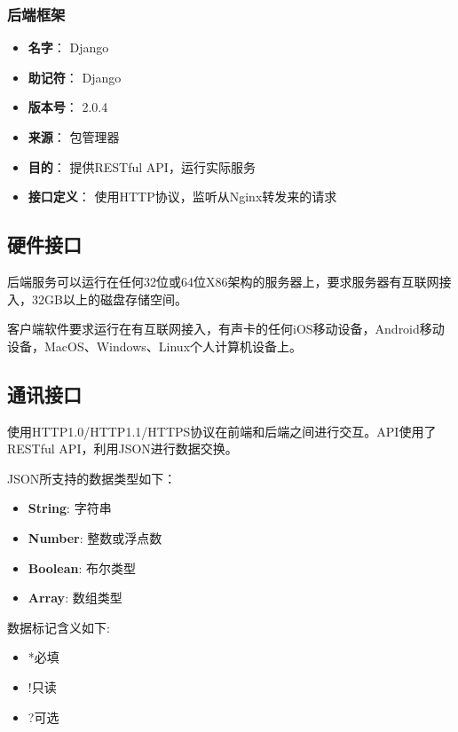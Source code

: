 \subsubsection{后端框架} %
\begin{itemize}
	\item \textbf{名字}：
	Django
	\item \textbf{助记符}：
	Django
	\item \textbf{版本号}：
	2.0.4
	\item \textbf{来源}：
	包管理器
	\item \textbf{目的}：
	提供RESTful API，运行实际服务
	\item \textbf{接口定义}：
	使用HTTP协议，监听从Nginx转发来的请求
\end{itemize}

\subsection{硬件接口}

后端服务可以运行在任何32位或64位X86架构的服务器上，要求服务器有互联网接入，32GB以上的磁盘存储空间。

客户端软件要求运行在有互联网接入，有声卡的任何iOS移动设备，Android移动设备，MacOS、Windows、Linux个人计算机设备上。


\subsection{通讯接口}

使用HTTP1.0/HTTP1.1/HTTPS协议在前端和后端之间进行交互。API使用了RESTful API，利用JSON进行数据交换。

JSON所支持的数据类型如下：
\begin{itemize}
	\item \textbf{String}: 字符串
	\item \textbf{Number}: 整数或浮点数
	\item \textbf{Boolean}: 布尔类型
	\item \textbf{Array}: 数组类型
\end{itemize}

数据标记含义如下:
\begin{itemize}
	\item *必填
	\item !只读
	\item ?可选
\end{itemize}

